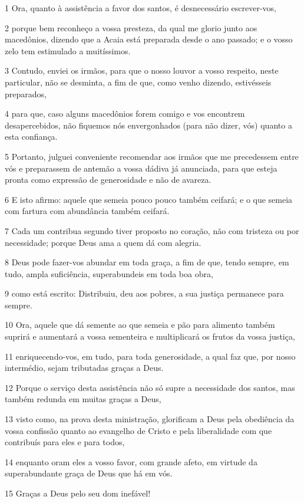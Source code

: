 \par 1 Ora, quanto à assistência a favor dos santos, é desnecessário escrever-vos,
\par 2 porque bem reconheço a vossa presteza, da qual me glorio junto aos macedônios, dizendo que a Acaia está preparada desde o ano passado; e o vosso zelo tem estimulado a muitíssimos.
\par 3 Contudo, enviei os irmãos, para que o nosso louvor a vosso respeito, neste particular, não se desminta, a fim de que, como venho dizendo, estivésseis preparados,
\par 4 para que, caso alguns macedônios forem comigo e vos encontrem desapercebidos, não fiquemos nós envergonhados (para não dizer, vós) quanto a esta confiança.
\par 5 Portanto, julguei conveniente recomendar aos irmãos que me precedessem entre vós e preparassem de antemão a vossa dádiva já anunciada, para que esteja pronta como expressão de generosidade e não de avareza.
\par 6 E isto afirmo: aquele que semeia pouco pouco também ceifará; e o que semeia com fartura com abundância também ceifará.
\par 7 Cada um contribua segundo tiver proposto no coração, não com tristeza ou por necessidade; porque Deus ama a quem dá com alegria.
\par 8 Deus pode fazer-vos abundar em toda graça, a fim de que, tendo sempre, em tudo, ampla suficiência, superabundeis em toda boa obra,
\par 9 como está escrito: Distribuiu, deu aos pobres, a sua justiça permanece para sempre.
\par 10 Ora, aquele que dá semente ao que semeia e pão para alimento também suprirá e aumentará a vossa sementeira e multiplicará os frutos da vossa justiça,
\par 11 enriquecendo-vos, em tudo, para toda generosidade, a qual faz que, por nosso intermédio, sejam tributadas graças a Deus.
\par 12 Porque o serviço desta assistência não só supre a necessidade dos santos, mas também redunda em muitas graças a Deus,
\par 13 visto como, na prova desta ministração, glorificam a Deus pela obediência da vossa confissão quanto ao evangelho de Cristo e pela liberalidade com que contribuís para eles e para todos,
\par 14 enquanto oram eles a vosso favor, com grande afeto, em virtude da superabundante graça de Deus que há em vós.
\par 15 Graças a Deus pelo seu dom inefável!

